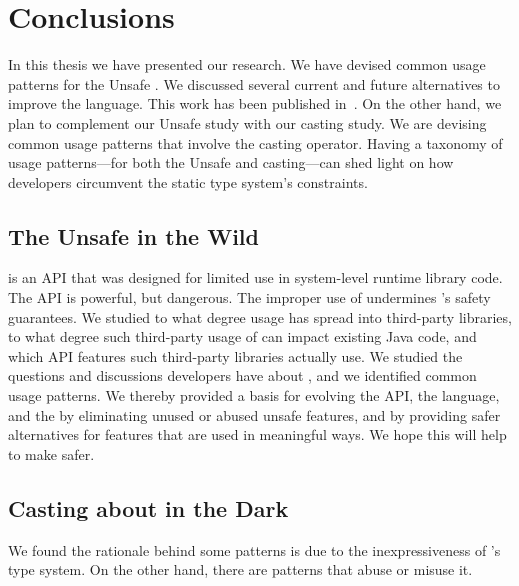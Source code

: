 \chapter{Conclusions}\label{cha:conclusions}


In this thesis we have presented our research.
We have devised common usage patterns for the \java{} Unsafe \api.
We discussed several current and future alternatives to improve the
\java{} language.
This work has been published in~\citep{mastrangeloUseYourOwn2015}.
On the other hand, we plan to complement our Unsafe \api{} study with 
our casting study.
We are devising common usage patterns that involve the casting operator.
Having a taxonomy of usage patterns---for both the Unsafe \api{} and casting---can shed light on how \java{} developers circumvent
the static type system's constraints.

\section{The \java{} Unsafe \api{} in the Wild}

\smu{} is an API that was designed for limited use in system-level runtime library code.
The \unsafe{} API is powerful, but dangerous.
The improper use of \unsafe{} undermines \java{}'s safety guarantees.
We studied to what degree \unsafe{} usage has spread into third-party libraries,
to what degree such third-party usage of \unsafe{} can impact existing Java code,
and which \unsafe{} API features such third-party libraries actually use.
We studied the questions and discussions developers have about \unsafe{},
and we identified common usage patterns.
We thereby provided a basis for evolving the \unsafe{} API, the \java{} language, and the \jvm{}
by eliminating unused or abused unsafe features,
and by providing safer alternatives for features that are used in meaningful ways.
We hope this will help to make \unsafe{} safer.


\section{Casting about in the Dark}

We found the rationale behind some patterns is due to the inexpressiveness of \java{}'s type system.
On the other hand,
there are patterns that abuse or misuse it.

